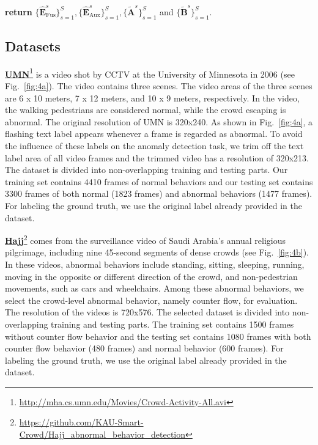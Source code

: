 \documentclass[journal]{IEEEtran}
\begin{document}
\begin{algorithm}[]
\begin{algorithmic}[1]
\STATE \textbf{return} $ \{\hat{\mathbf{E}}_{\mathrm{Fus}}^{s}\}_{s=1}^{S} ,\{\hat{\mathbf{E}}_{\mathrm{Aux}}^s\}_{s=1}^{S} ,  \{\tilde{\mathbf{A}}^{s}\}_{s=1}^{S}  $ and $ \{\tilde{\mathbf{B}}^{s}\}_{s=1}^{S} $.
\end{algorithmic}
\end{algorithm}


\subsection{Datasets}
\label{appendix:dataset}

\noindent \underline{\textbf{UMN}}\footnote{\url{http://mha.cs.umn.edu/Movies/Crowd-Activity-All.avi}}
is a video shot by CCTV at the University of Minnesota in 2006 (see Fig.~\ref{fig:4a}). The video contains three scenes. The video areas of the three scenes are 6 x 10 meters, 7 x 12 meters, and 10 x 9 meters, respectively. In the video, the walking pedestrians are considered normal, while the crowd escaping is abnormal. The original resolution of UMN is 320x240. As shown in Fig.~\ref{fig:4a}, a flashing text label appears whenever a frame is regarded as abnormal. To avoid the influence of these labels on the anomaly detection task, we trim off the text label area of all video frames and the trimmed video has a resolution of 320x213. The dataset is divided into non-overlapping training and testing parts. Our training set contains 4410 frames of normal behaviors and our testing set contains 3300 frames of both normal (1823 frames) and abnormal behaviors (1477 frames). For labeling the ground truth, we use the original label already provided in the dataset. 


\vskip 0.1in
\noindent \underline{\textbf{Hajj}}\footnote{\url{https://github.com/KAU-Smart-Crowd/Hajj_abnormal_behavior_detection}} comes from the surveillance video of Saudi Arabia's annual religious pilgrimage, including nine 45-second segments of dense crowds (see Fig.~\ref{fig:4b}). In these videos, abnormal behaviors include standing, sitting, sleeping, running, moving in the opposite or different direction of the crowd, and non-pedestrian movements, such as cars and wheelchairs. Among these abnormal behaviors, we select the crowd-level abnormal behavior, namely counter flow, for evaluation. The resolution of the videos is 720x576. The selected dataset is divided into non-overlapping training and testing parts. The training set contains 1500 frames without counter flow behavior and the testing set contains 1080 frames with both counter flow behavior (480 frames) and normal behavior (600 frames). For labeling the ground truth, we use the original label already provided in the dataset. 
\end{document}
